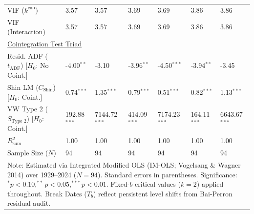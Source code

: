 \begin{table}[H]
\begin{tabular}{p{3.8cm}p{1.35cm}p{1.35cm}p{1.35cm}p{1.35cm}p{1.35cm}p{1.35cm}}
VIF ($k^{\text{cap}}$) & 3.57 & 3.57 & 3.69 & 3.69 & 3.86 & 3.86  \\
VIF (Interaction) & 3.57 & 3.57 & 3.69 & 3.69 & 3.86 & 3.86  \\
\midrule
\multicolumn{7}{l}{\underline{Cointegration Test Triad}} \\
\makecell[l]{Resid. ADF ($t_{\text{ADF}}$) \\ {\scriptsize [$H_0$: No Coint.]}} & -4.00$^{**}$ & -3.10 & -3.96$^{**}$ & -4.50$^{***}$ & -3.94$^{**}$ & -3.45  \\
\makecell[l]{Shin LM ($C_{\text{Shin}}$) \\ {\scriptsize [$H_0$: Coint.]}} & 0.74$^{***}$ & 1.35$^{***}$ & 0.79$^{***}$ & 0.51$^{***}$ & 0.82$^{***}$ & 1.13$^{***}$  \\
\makecell[l]{VW Type 2 ($S_{\text{Type 2}}$) \\ {\scriptsize [$H_0$: Coint.]}} & 192.88$^{***}$ & 7144.72$^{***}$ & 414.09$^{***}$ & 7174.23$^{***}$ & 164.11$^{***}$ & 6643.67$^{***}$  \\
\midrule
$R^2_{\text{sum}}$ & 1.00 & 1.00 & 1.00 & 1.00 & 1.00 & 1.00  \\
Sample Size ($N$) & 94 & 94 & 94 & 94 & 94 & 94  \\
\bottomrule
\multicolumn{7}{p{13.2cm}}{\footnotesize Note: Estimated via Integrated Modified OLS (IM-OLS; Vogelsang \& Wagner 2014) over 1929--2024 ($N=94$). Standard errors in parentheses. Significance: $^*p<0.10, ^{**}p<0.05, ^{***}p<0.01$. Fixed-$b$ critical values ($k=2$) applied throughout. Break Dates ($T_b$) reflect persistent level shifts from Bai-Perron residual audit.}
\end{tabular}
\end{table}
